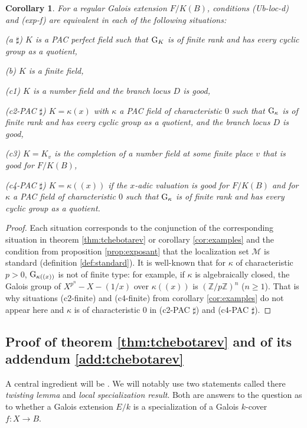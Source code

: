 \documentclass[12pt,english]{amsart}
\newtheorem{twisting lemma}[theorem]{Twisting lemma}
\newtheorem{corollary}[theorem]{Corollary}
\begin{document}
\begin{corollary} 
For a regular Galois extension $F/K(B)$, conditions {\rm (Ub-loc-d)} and {\rm (exp-f)} are equivalent in each of the following situations:
\vskip 1mm

\noindent
{\rm (a\hskip 2pt $\sharp$)} $K$ is a PAC perfect field such that ${\hbox{\rm G}}_K$ is of finite rank and has every cyclic group as a quotient,
\vskip 1mm

\noindent
{\rm (b)} $K$ is a finite field,
\vskip 1mm

\noindent
{\rm (c1)} $K$ is a number field and the branch locus $D$ is good,
\vskip 1mm

\noindent
{\rm (c2-PAC\hskip 2pt $\sharp$)} $K=\kappa(x)$ with $\kappa$ a PAC field of characteristic $0$ such that ${\hbox{\rm G}}_\kappa$ is of finite rank and has every cyclic group as a quotient, and the branch locus $D$ is good,
\vskip 1mm

\noindent
{\rm (c3)} $K=K_v$ is the completion of a number field at some finite place $v$ that is good for $F/K(B)$,
\vskip 1mm

\noindent
{\rm (c4-PAC\hskip 2pt $\sharp$)} $K=\kappa((x))$ if the $x$-adic valuation is good for $F/K(B)$ and for $\kappa$ a PAC field of characteristic $0$ such that ${\hbox{\rm G}}_\kappa$ is of finite rank and has every cyclic group as a quotient.
\end{corollary}

\begin{proof}
Each situation corresponds to the conjunction of the corresponding situation in theorem \ref{thm:tchebotarev} or corollary \ref{cor:examples} and the condition from proposition \ref{prop:exposant} that the localization set ${\mathcal M}$ is standard (definition \ref{def:standard}).
It is well-known that for $\kappa$ of characteristic $p>0$, ${\hbox{\rm G}}_{\kappa((x))}$ is not of finite type: for example, if $\kappa$ is algebraically closed, the Galois group of $X^{p^n}-X - (1/x)$ over $\kappa((x))$ is $({\mathbb{Z}}/p{\mathbb{Z}})^n$ ($n\geq 1$).
That is why situations (c2-finite) and (c4-finite) from corollary \ref{cor:examples} do not appear here and $\kappa$ is of characteristic $0$ in {\rm (c2-PAC\hskip 2pt $\sharp$)} and {\rm (c4-PAC\hskip 2pt $\sharp$)}.
\end{proof}

\subsection{Proof of theorem \ref{thm:tchebotarev} and of its addendum \ref{add:tchebotarev}} \label{sec:proof-tchebotarev}
A central ingredient will be  \cite{DEGha}. 
We will notably use two statements called there {\it twisting lemma} 
and {\it local specialization result}. Both are answers to the question as to whether a Galois extension $E/k$ is a specialization of a Galois $k$-cover $f:X\rightarrow B$.
\end{document}
